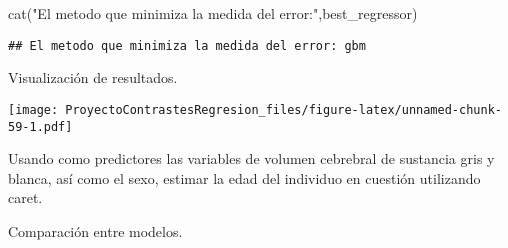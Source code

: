 \documentclass[
]{article}
\newenvironment{Shaded}{\begin{snugshade}}{\end{snugshade}}
\newcommand{\AttributeTok}[1]{\textcolor[rgb]{0.77,0.63,0.00}{#1}}
\newcommand{\ConstantTok}[1]{\textcolor[rgb]{0.00,0.00,0.00}{#1}}
\newcommand{\DecValTok}[1]{\textcolor[rgb]{0.00,0.00,0.81}{#1}}
\newcommand{\FunctionTok}[1]{\textcolor[rgb]{0.00,0.00,0.00}{#1}}
\newcommand{\NormalTok}[1]{#1}
\newcommand{\OtherTok}[1]{\textcolor[rgb]{0.56,0.35,0.01}{#1}}
\newcommand{\SpecialCharTok}[1]{\textcolor[rgb]{0.00,0.00,0.00}{#1}}
\newcommand{\StringTok}[1]{\textcolor[rgb]{0.31,0.60,0.02}{#1}}
\begin{document}
\begin{Shaded}
\begin{Highlighting}[]
\FunctionTok{cat}\NormalTok{(}\StringTok{"El metodo que minimiza la medida del error:"}\NormalTok{,best\_regressor)}
\end{Highlighting}
\end{Shaded}

\begin{verbatim}
## El metodo que minimiza la medida del error: gbm
\end{verbatim}

Visualización de resultados.

\begin{Shaded}
\end{Shaded}

\texttt{[image: ProyectoContrastesRegresion\_files/figure-latex/unnamed-chunk-59-1.pdf]}

Usando como predictores las variables de volumen cebrebral de sustancia
gris y blanca, así como el sexo, estimar la edad del individuo en
cuestión utilizando caret.

\begin{Shaded}
\end{Shaded}

Comparación entre modelos.
\end{document}
